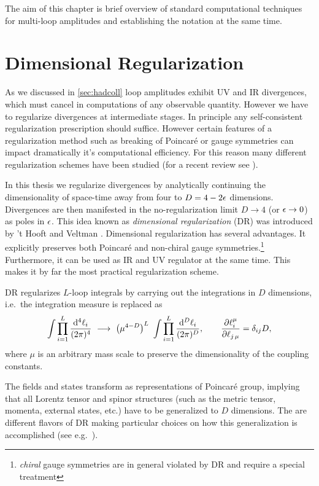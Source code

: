 The aim of this chapter is brief overview of standard computational techniques for multi-loop amplitudes and
establishing the notation at the same time.

\section{Dimensional Regularization}



As we discussed in \cref{sec:hadcoll} loop amplitudes exhibit UV and IR divergences,
which must cancel in computations of any observable quantity.
However we have to regularize divergences at intermediate stages.
In principle any self-consistent regularization prescription should suffice.
However certain features of a regularization method such as breaking of Poincaré or gauge symmetries
can impact dramatically it's computational efficiency.
For this reason many different regularization schemes have been studied (for a recent review see \cite{Gnendiger:2017pys}).

In this thesis we regularize divergences by analytically continuing the dimensionality of space-time away from four to $D = 4 - 2\epsilon$ dimensions.
Divergences are then manifested in the no-regularization limit $D\to4$ (or $\epsilon\to0$) as poles in $\epsilon$.
This idea known as \emph{dimensional regularization} (DR) was introduced by 't Hooft and Veltman \cite{tHooft:1972tcz}.
Dimensional regularization has several advantages.
It explicitly preserves both Poincaré and non-chiral gauge symmetries.\footnote{\emph{chiral} gauge symmetries are in general violated by DR and require a special treatment}
Furthermore, it can be used as IR and UV regulator at the same time.
This makes it by far the most practical regularization scheme.


DR regularizes $L$-loop integrals by carrying out the integrations in $D$ dimensions, i.e.\ the integration measure is replaced as
\begin{equation}
  \int \prod_{i=1}^{L} \frac{\dd[4]{\ell_i}}{(2\pi)^{4}} ~\longrightarrow~ \quantity(\mu^{4-D})^{L}~\int \prod_{i=1}^{L} \frac{\dd[D]{\ell_i}}{(2\pi)^{D}}, \qquad \pdv{\ell^\mu_i}{\ell_{j\,\mu}} = \delta_{i j} D,
  \label{eq:dimregmeasure}
\end{equation}
where $\mu$ is an arbitrary mass scale to preserve the dimensionality of the coupling constants.

The fields and states transform as representations of Poincaré group,
implying that all Lorentz tensor and spinor structures (such as the metric tensor, momenta, external states, etc.\@) have
to be generalized to $D$ dimensions.
The are different flavors of DR making particular choices on how this generalization is accomplished (see e.g.\ \cite{Gnendiger:2017pys}).

